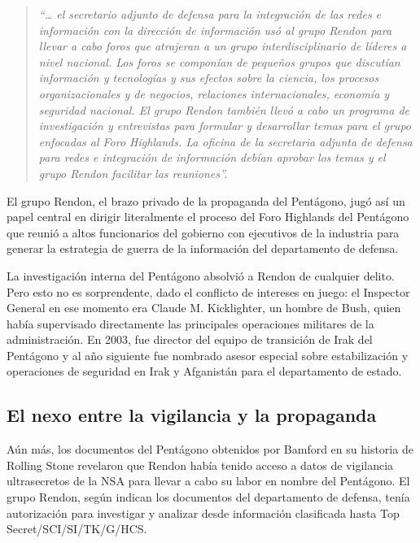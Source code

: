 \documentclass[10pt,a5paper,twoside,spanish,]{book}
\begin{document}
\begin{quote}
\emph{``\ldots{} el secretario adjunto de defensa para la integración de
las redes e información con la dirección de información usó al grupo
Rendon para llevar a cabo foros que atrajeran a un grupo
interdisciplinario de líderes a nivel nacional. Los foros se componían
de pequeños grupos que discutían información y tecnologías y sus efectos
sobre la ciencia, los procesos organizacionales y de negocios,
relaciones internacionales, economía y seguridad nacional. El grupo
Rendon también llevó a cabo un programa de investigación y entrevistas
para formular y desarrollar temas para el grupo enfocadas al Foro
Highlands. La oficina de la secretaria adjunta de defensa para redes e
integración de información debían aprobar los temas y el grupo Rendon
facilitar las reuniones''.}
\end{quote}

El grupo Rendon, el brazo privado de la propaganda del Pentágono, jugó
así un papel central en dirigir literalmente el proceso del Foro
Highlands del Pentágono que reunió a altos funcionarios del gobierno con
ejecutivos de la industria para generar la estrategia de guerra de la
información del departamento de defensa.

La investigación interna del Pentágono absolvió a Rendon de cualquier
delito. Pero esto no es sorprendente, dado el conflicto de intereses en
juego: el Inspector General en ese momento era Claude M. Kicklighter, un
hombre de Bush, quien había supervisado directamente las principales
operaciones militares de la administración. En 2003, fue director del
equipo de transición de Irak del Pentágono y al año siguiente fue
nombrado asesor especial sobre estabilización y operaciones de seguridad
en Irak y Afganistán para el departamento de estado.

\subsection{El nexo entre la vigilancia y la
propaganda}\label{el-nexo-entre-la-vigilancia-y-la-propaganda}

Aún más, los documentos del Pentágono obtenidos por Bamford en su
historia de Rolling Stone revelaron que Rendon había tenido acceso a
datos de vigilancia ultrasecretos de la NSA para llevar a cabo su labor
en nombre del Pentágono. El grupo Rendon, según indican los documentos
del departamento de defensa, tenía autorización para investigar y
analizar desde información clasificada hasta Top Secret/SCI/SI/TK/G/HCS.
\end{document}
